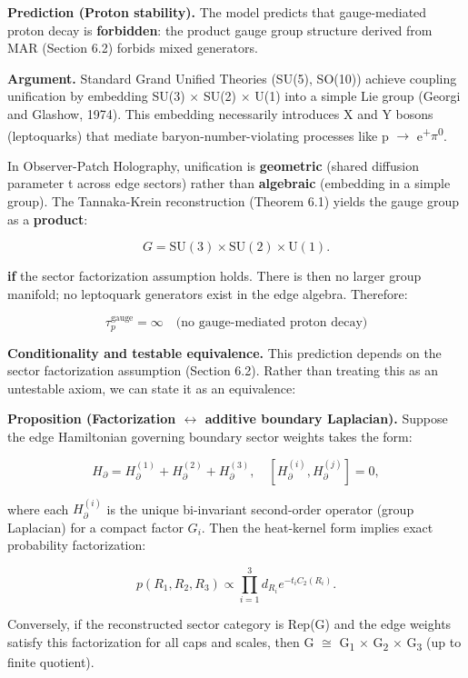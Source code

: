 \documentclass[11pt,a4paper]{article}
\theoremstyle{remark}
\begin{document}
\textbf{Prediction (Proton stability).} The model predicts that
gauge-mediated proton decay is \textbf{forbidden}: the product gauge group
structure derived from MAR (Section 6.2) forbids mixed generators.

\textbf{Argument.} Standard Grand Unified Theories (SU(5), SO(10)) achieve
coupling unification by embedding SU(3) \ensuremath{\times} SU(2) \ensuremath{\times} U(1) into a
simple Lie group (Georgi and Glashow, 1974). This embedding necessarily
introduces X and Y bosons (leptoquarks) that mediate baryon-number-violating
processes like p \ensuremath{\to} e\textsuperscript{+}\ensuremath{\pi}\textsuperscript{0}.

In Observer-Patch Holography, unification is \textbf{geometric} (shared diffusion
parameter t across edge sectors) rather than \textbf{algebraic} (embedding in a
simple group). The Tannaka-Krein reconstruction (Theorem 6.1) yields the
gauge group as a \textbf{product}:

\[
G = \mathrm{SU}(3) \times \mathrm{SU}(2) \times \mathrm{U}(1).
\]

\textbf{if} the sector factorization assumption holds. There is then no larger
group manifold; no leptoquark generators exist in the edge algebra.
Therefore:

\[
\tau_p^{\mathrm{gauge}} = \infty \quad \text{(no gauge-mediated proton decay)}
\]

\textbf{Conditionality and testable equivalence.} This prediction depends on the
sector factorization assumption (Section 6.2). Rather than treating this as
an untestable axiom, we can state it as an equivalence:

\textbf{Proposition (Factorization \ensuremath{\leftrightarrow} additive boundary Laplacian).} Suppose the
edge Hamiltonian governing boundary sector weights takes the form:

\[
H_{\partial} = H^{(1)}_{\partial} + H^{(2)}_{\partial} + H^{(3)}_{\partial},
\quad [H^{(i)}_{\partial}, H^{(j)}_{\partial}] = 0,
\]

where each \(H^{(i)}_{\partial}\) is the unique bi-invariant second-order operator
(group Laplacian) for a compact factor \(G_i\). Then the heat-kernel form implies
exact probability factorization:

\[
p(R_1, R_2, R_3) \propto \prod_{i=1}^3 d_{R_i} e^{-t_i C_2(R_i)}.
\]

Conversely, if the reconstructed sector category is Rep(G) and the edge weights
satisfy this factorization for all caps and scales, then G \ensuremath{\cong} G\textsubscript{1} \ensuremath{\times} G\textsubscript{2} \ensuremath{\times} G\textsubscript{3}
(up to finite quotient).
\end{document}
